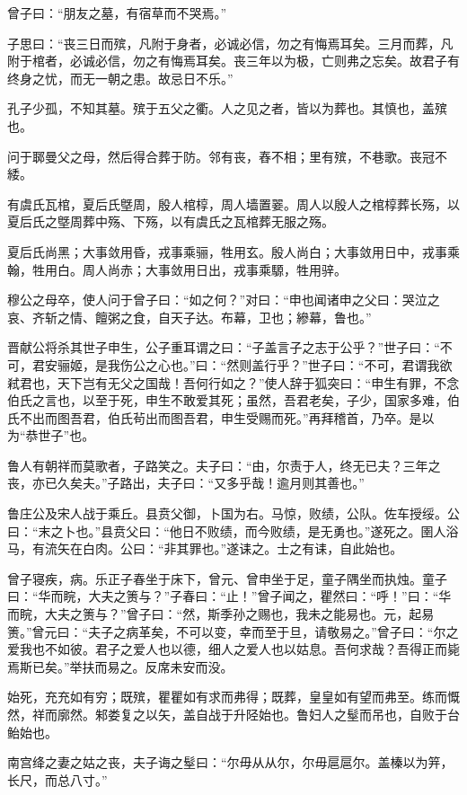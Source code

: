 \documentclass[]{article}
\begin{document}
曾子曰：``朋友之墓，有宿草而不哭焉。''

子思曰：``丧三日而殡，凡附于身者，必诚必信，勿之有悔焉耳矣。三月而葬，凡附于棺者，必诚必信，勿之有悔焉耳矣。丧三年以为极，亡则弗之忘矣。故君子有终身之忧，而无一朝之患。故忌日不乐。''

孔子少孤，不知其墓。殡于五父之衢。人之见之者，皆以为葬也。其慎也，盖殡也。

问于郰曼父之母，然后得合葬于防。邻有丧，舂不相；里有殡，不巷歌。丧冠不緌。

有虞氏瓦棺，夏后氏墍周，殷人棺椁，周人墙置翣。周人以殷人之棺椁葬长殇，以夏后氏之墍周葬中殇、下殇，以有虞氏之瓦棺葬无服之殇。

夏后氏尚黑；大事敛用昏，戎事乘骊，牲用玄。殷人尚白；大事敛用日中，戎事乘翰，牲用白。周人尚赤；大事敛用日出，戎事乘騵，牲用骍。

穆公之母卒，使人问于曾子曰：``如之何？''对曰：``申也闻诸申之父曰：哭泣之哀、齐斩之情、饘粥之食，自天子达。布幕，卫也；縿幕，鲁也。''

晋献公将杀其世子申生，公子重耳谓之曰：``子盖言子之志于公乎？''世子曰：``不可，君安骊姬，是我伤公之心也。''曰：``然则盖行乎？''世子曰：``不可，君谓我欲弒君也，天下岂有无父之国哉！吾何行如之？''使人辞于狐突曰：``申生有罪，不念伯氏之言也，以至于死，申生不敢爱其死；虽然，吾君老矣，子少，国家多难，伯氏不出而图吾君，伯氏茍出而图吾君，申生受赐而死。''再拜稽首，乃卒。是以为``恭世子''也。

鲁人有朝祥而莫歌者，子路笑之。夫子曰：``由，尔责于人，终无已夫？三年之丧，亦已久矣夫。''子路出，夫子曰：``又多乎哉！逾月则其善也。''

鲁庄公及宋人战于乘丘。县贲父御，卜国为右。马惊，败绩，公队。佐车授绥。公曰：``末之卜也。''县贲父曰：``他日不败绩，而今败绩，是无勇也。''遂死之。圉人浴马，有流矢在白肉。公曰：``非其罪也。''遂诔之。士之有诔，自此始也。

曾子寝疾，病。乐正子春坐于床下，曾元、曾申坐于足，童子隅坐而执烛。童子曰：``华而睆，大夫之箦与？''子春曰：``止！''曾子闻之，瞿然曰：``呼！''曰：``华而睆，大夫之箦与？''曾子曰：``然，斯季孙之赐也，我未之能易也。元，起易箦。''曾元曰：``夫子之病革矣，不可以变，幸而至于旦，请敬易之。''曾子曰：``尔之爱我也不如彼。君子之爱人也以德，细人之爱人也以姑息。吾何求哉？吾得正而毙焉斯已矣。''举扶而易之。反席未安而没。

始死，充充如有穷；既殡，瞿瞿如有求而弗得；既葬，皇皇如有望而弗至。练而慨然，祥而廓然。邾娄复之以矢，盖自战于升陉始也。鲁妇人之髽而吊也，自败于台鲐始也。

南宫绛之妻之姑之丧，夫子诲之髽曰：``尔毋从从尔，尔毋扈扈尔。盖榛以为笄，长尺，而总八寸。''
\end{document}
